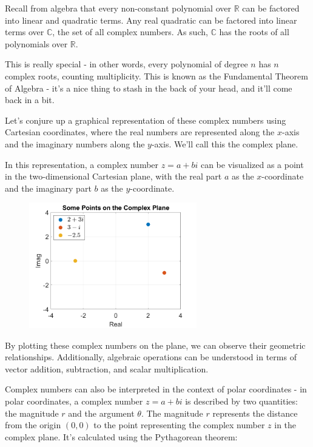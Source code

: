 \documentclass[
  letterpaper,
  DIV=11,
  numbers=noendperiod]{scrreprt}
\begin{document}
Recall from algebra that every non-constant polynomial over
\(\mathbb{R}\) can be factored into linear and quadratic terms. Any real
quadratic can be factored into linear terms over \(\mathbb{C}\), the set
of all complex numbers. As such, \(\mathbb{C}\) has the roots of all
polynomials over \(\mathbb{R}%
\).

This is really special - in other words, every polynomial of degree
\(n\) has \(n\) complex roots, counting multiplicity. This is known as
the Fundamental Theorem of Algebra - it's a nice thing to stash in the
back of your head, and it'll come back in a bit.

Let's conjure up a graphical representation of these complex numbers
using Cartesian coordinates, where the real numbers are represented
along the \(x\)-axis and the imaginary numbers along the \(y\)-axis.
We'll call this the complex plane.

In this representation, a complex number \(z = a + bi\) can be
visualized as a point in the two-dimensional Cartesian plane, with the
real part \(a\) as the \(x\)-coordinate and the imaginary part \(b\) as
the \(y\)-coordinate.

\begin{figure}

{\centering \includegraphics[width=0.65\textwidth,height=\textheight]{figs/3_poles.png}

}

\end{figure}

By plotting these complex numbers on the plane, we can observe their
geometric relationships. Additionally, algebraic operations can be
understood in terms of vector addition, subtraction, and scalar
multiplication.

Complex numbers can also be interpreted in the context of polar
coordinates - in polar coordinates, a complex number \(z = a + bi\) is
described by two quantities: the magnitude \(r\) and the argument
\(\theta\). The magnitude \(r\) represents the distance from the origin
\((0,0)\) to the point representing the complex number \(z\) in the
complex plane. It's calculated using the Pythagorean theorem:
\end{document}
